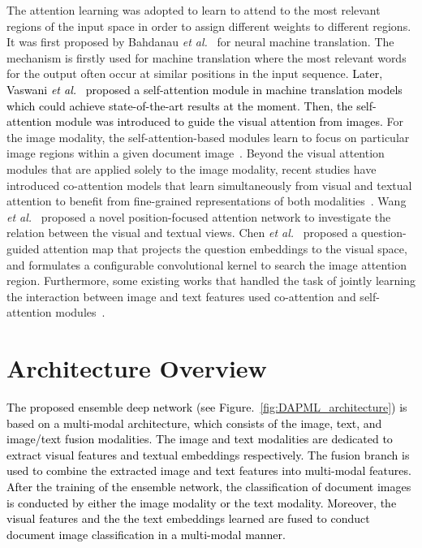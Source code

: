 \documentclass[twocolumn]{svjour3}
\newcommand{\etal}{\textit{et al.}}
\begin{document}
The attention learning was adopted to learn to attend to the most relevant regions of the input space in order to assign different weights to different regions. It was first proposed by Bahdanau \etal~\cite{Bahdanau2015NeuralMT} for neural machine translation. The mechanism is firstly used for machine translation where the most relevant words for the output often occur at similar positions in the input sequence. \textcolor{black}{Later, Vaswani \etal~\cite{vaswani2017attention} proposed a self-attention module in machine translation models which could achieve state-of-the-art results at the moment. Then, the self-attention module was introduced to guide the visual attention from images.}
For the image modality, the self-attention-based modules learn to focus on particular image regions within a given document image~\cite{Wang2018NonlocalNN, ramachandran2019standalone, Zhao2020ExploringSF}. Beyond the visual attention modules that are applied solely to the image modality, recent studies have introduced co-attention models that learn simultaneously from visual and textual attention to benefit from fine-grained representations of both modalities~\cite{NEURIPS2018_96ea64f3, Nguyen2018ImprovedFO}.
Wang \etal~\cite{wang2019position} proposed a novel position-focused attention network to investigate the relation between the visual and textual views. Chen \etal~\cite{chen2016abccnn} proposed a question-guided attention map that projects the question embeddings to the visual space, and formulates a configurable convolutional kernel to search the image attention region. Furthermore, some existing works that handled the task of jointly learning the interaction between image and text features used co-attention and self-attention modules~\cite{lu2017hierarchical, Yu_2017_ICCV, Yu2019MultimodalUA, Yu_2018}. 

\section{Architecture Overview}
\label{sec:Architecture_Overview}

\textcolor{black}{The proposed ensemble deep network (see Figure.~\ref{fig:DAPML_architecture}) is based on a multi-modal architecture, which consists of the image, text, and image/text fusion modalities. The image and text modalities are dedicated to extract visual features and textual embeddings respectively. The fusion branch is used to combine the extracted image and text features into multi-modal features. After the training of the ensemble network, the classification of document images is conducted by either the image modality or the text modality. Moreover, the visual features and the the text embeddings learned are fused to conduct document image classification in a multi-modal manner.}
\end{document}

